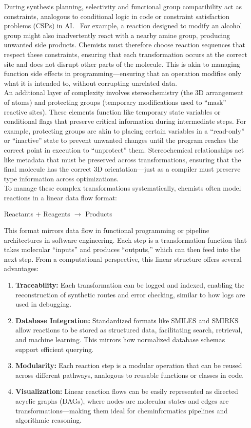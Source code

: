 \documentclass[12pt]{article}
\begin{document}
During synthesis planning, selectivity and functional group compatibility act as constraints, analogous to conditional logic in code or constraint satisfaction problems (CSPs) in AI.~\cite{10.1109/ICTAI.2004.38}
For example, a reaction designed to modify an alcohol group might also inadvertently react with a nearby amine group, producing unwanted side products.
Chemists must therefore choose reaction sequences that respect these constraints, ensuring that each transformation occurs at the correct site and does not disrupt other parts of the molecule.
This is akin to managing function side effects in programming—ensuring that an operation modifies only what it is intended to, without corrupting unrelated data.
\\
\indent
An additional layer of complexity involves stereochemistry (the 3D arrangement of atoms) and protecting groups (temporary modifications used to “mask” reactive sites).
These elements function like temporary state variables or conditional flags that preserve critical information during intermediate steps.
For example, protecting groups are akin to placing certain variables in a “read-only” or “inactive” state to prevent unwanted changes until the program reaches the correct point in execution to “unprotect” them.
Stereochemical relationships act like metadata that must be preserved across transformations, ensuring that the final molecule has the correct 3D orientation—just as a compiler must preserve type information across optimizations.
\\
\indent
To manage these complex transformations systematically, chemists often model reactions in a linear data flow format:
\\
\begin{center}
{Reactants $+$ Reagents $\rightarrow$ Products}
\end{center}
\indent
This format mirrors data flow in functional programming or pipeline architectures in software engineering.
Each step is a transformation function that takes molecular “inputs” and produces “outputs,” which can then feed into the next step.
From a computational perspective, this linear structure offers several advantages:
{\sloppy
\begin{enumerate}
    \item \textbf{Traceability:} Each transformation can be logged and indexed, enabling the reconstruction of synthetic routes and error checking, similar to how logs are used in debugging.
    \item \textbf{Database Integration:} Standardized formats like SMILES and SMIRKS allow reactions to be stored as structured data, facilitating search, retrieval, and machine learning. This mirrors how normalized database schemas support efficient querying.
    \item \textbf{Modularity:} Each reaction step is a modular operation that can be reused across different pathways, analogous to reusable functions or classes in code.
    \item \textbf{Visualization:} Linear reaction flows can be easily represented as directed acyclic graphs (DAGs), where nodes are molecular states and edges are transformations—making them ideal for cheminformatics pipelines and algorithmic reasoning.
\end{enumerate}
}
\end{document}
